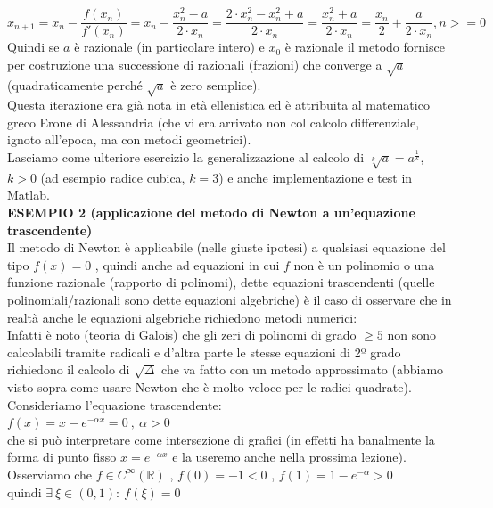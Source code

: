 \documentclass[12pt]{article}
\begin{document}
\begin{equation*}
    x_{n+1} = x_n - \frac{f(x_n)}{f'(x_n)} = x_n - \frac{x_n^2-a}{2\cdot x_n} = \frac{2\cdot x_n^2 - x_n^2 + a}{2\cdot x_n} = \frac{x_n^2 + a}{2 \cdot x_n} = \frac{x_n}{2} + \frac{a}{2\cdot x_n}, n >= 0
\end{equation*}
Quindi se $a$ è razionale (in particolare intero) e $x_0$ è razionale il metodo fornisce per costruzione una successione di razionali (frazioni) che converge a $\sqrt{a}$ (quadraticamente perché $\sqrt{a}$ è zero semplice).\\
Questa iterazione era già nota in età ellenistica ed è attribuita al matematico greco Erone di Alessandria (che vi era arrivato non col calcolo differenziale, ignoto all'epoca, ma con metodi geometrici).\\
Lasciamo come ulteriore esercizio la generalizzazione al calcolo di $\sqrt[k]{a} = a^{\frac{1}{k}}$, $k>0$ (ad esempio radice cubica, $k=3$) e anche implementazione e test in Matlab.
\vspace{0.5cm}\\
\textbf{ESEMPIO 2 (applicazione del metodo di Newton a un'equazione trascendente)}\\
Il metodo di Newton è applicabile (nelle giuste ipotesi) a qualsiasi equazione del tipo $f(x)=0$ , quindi anche ad equazioni in cui $f$ non è un polinomio o una funzione razionale (rapporto di polinomi), dette equazioni trascendenti (quelle polinomiali/razionali sono dette equazioni algebriche) è il caso di osservare che in realtà anche le equazioni algebriche richiedono metodi numerici:\\
Infatti è noto (teoria di Galois) che gli zeri di polinomi di grado $\geq 5$ non sono calcolabili tramite radicali e d'altra parte le stesse equazioni di 2º grado richiedono il calcolo di $\sqrt{\Delta}$ che va fatto con un metodo approssimato (abbiamo visto sopra come usare Newton che è molto veloce per le radici quadrate). \\
Consideriamo l'equazione trascendente: \\
$f(x)=x-e^{-\alpha x}=0 \ , \ \alpha>0$\\
che si può interpretare come intersezione di grafici (in effetti ha banalmente la forma di punto fisso $x=e^{-\alpha x}$ e la useremo anche nella prossima lezione).\\
Osserviamo che $f \in C^{\infty}(\mathbb{R})$ , $f(0)=-1<0$ , $f(1)=1-e^{-\alpha}>0$ \\
quindi $\exists \  \xi \in (0,1):\ f(\xi)=0$\\
\end{document}
